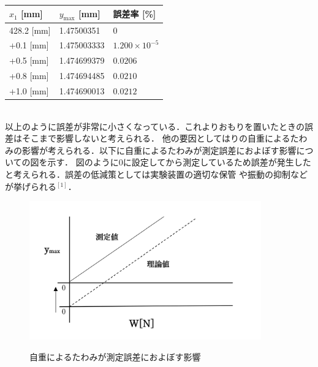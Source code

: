 \documentclass[a4paper,11pt]{jsarticle}
\begin{document}
\begin{enumerate}
\begin{table}[h]
          \begin{tabular}{|p{3cm}|p{3cm}|p{4cm}|}
            \hline
            $x_1$ [mm] & $y_{\text{max}}$ [mm] & 誤差率 [\%]            \\\hline
            428.2 [mm] & 1.47500351            & 0                      \\\hline
            +0.1 [mm]  & 1.475003333           & $1.200 \times 10^{-5}$ \\\hline
            +0.5 [mm]  & 1.474699379           & $0.0206$               \\\hline
            +0.8 [mm]  & 1.474694485           & $0.0210$               \\\hline
            +1.0 [mm]  & 1.474690013           & $0.0212 $              \\\hline
          \end{tabular}
        \end{table}\\
        以上のように誤差が非常に小さくなっている．これよりおもりを置いたときの誤差はそこまで影響しないと考えられる．
        他の要因としてはりの自重によるたわみの影響が考えられる．以下に自重によるたわみが測定誤差におよぼす影響についての図を示す．
        図のように0に設定してから測定しているため誤差が発生したと考えられる．誤差の低減策としては実験装置の適切な保管
        や振動の抑制などが挙げられる$^{[1]}$．
        \clearpage
        \begin{figure}[h]
          \centering
          {\includegraphics[width=10cm]{9.jpg}}
          \caption{自重によるたわみが測定誤差におよぼす影響}
        \end{figure}




\end{enumerate}
\end{document}
